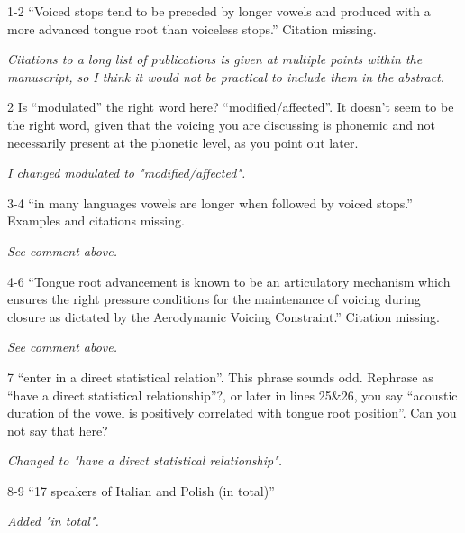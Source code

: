 \documentclass[]{article}
\begin{document}
1-2 ``Voiced stops tend to be preceded by longer vowels and produced
with a more advanced tongue root than voiceless stops.'' Citation
missing.

\begin{adjustwidth}{1cm}{} \textit{
Citations to a long list of publications is given at multiple points within the manuscript, so I think it would not be practical to include them in the abstract.
} \end{adjustwidth}

2 Is ``modulated'' the right word here? ``modified/affected''. It
doesn't seem to be the right word, given that the voicing you are
discussing is phonemic and not necessarily present at the phonetic
level, as you point out later.

\begin{adjustwidth}{1cm}{} \textit{
I changed modulated to "modified/affected".
} \end{adjustwidth}

3-4 ``in many languages vowels are longer when followed by voiced
stops.'' Examples and citations missing.

\begin{adjustwidth}{1cm}{} \textit{
See comment above.
} \end{adjustwidth}

4-6 ``Tongue root advancement is known to be an articulatory mechanism
which ensures the right pressure conditions for the maintenance of
voicing during closure as dictated by the Aerodynamic Voicing
Constraint.'' Citation missing.

\begin{adjustwidth}{1cm}{} \textit{
See comment above.
} \end{adjustwidth}

7 ``enter in a direct statistical relation''. This phrase sounds odd.
Rephrase as ``have a direct statistical relationship''?, or later in
lines 25\&26, you say ``acoustic duration of the vowel is positively
correlated with tongue root position''. Can you not say that here?

\begin{adjustwidth}{1cm}{} \textit{
Changed to "have a direct statistical relationship".
} \end{adjustwidth}

8-9 ``17 speakers of Italian and Polish (in total)''

\begin{adjustwidth}{1cm}{} \textit{
Added "in total".
} \end{adjustwidth}
\end{document}
